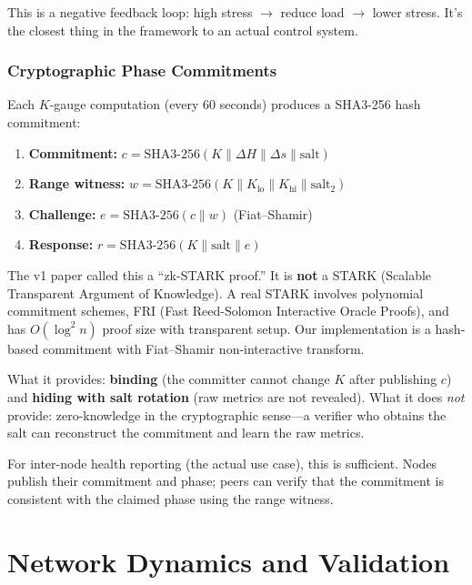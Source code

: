 \documentclass[11pt,a4paper]{article}
\begin{document}
This is a negative feedback loop: high stress $\to$ reduce load $\to$ lower stress. It's the closest thing in the framework to an actual control system.

\section{Cryptographic Phase Commitments}

Each $K$-gauge computation (every 60 seconds) produces a SHA3-256 hash commitment:

\begin{enumerate}[nosep]
    \item \textbf{Commitment:} $c = \text{SHA3-256}(K \| \Delta H \| \Delta s \| \text{salt})$
    \item \textbf{Range witness:} $w = \text{SHA3-256}(K \| K_{\text{lo}} \| K_{\text{hi}} \| \text{salt}_2)$
    \item \textbf{Challenge:} $e = \text{SHA3-256}(c \| w)$ (Fiat--Shamir)
    \item \textbf{Response:} $r = \text{SHA3-256}(K \| \text{salt} \| e)$
\end{enumerate}

\begin{honesty}
The v1 paper called this a ``zk-STARK proof.'' It is \textbf{not} a STARK (Scalable Transparent Argument of Knowledge). A real STARK involves polynomial commitment schemes, FRI (Fast Reed-Solomon Interactive Oracle Proofs), and has $O(\log^2 n)$ proof size with transparent setup. Our implementation is a hash-based commitment with Fiat--Shamir non-interactive transform.

What it provides: \textbf{binding} (the committer cannot change $K$ after publishing $c$) and \textbf{hiding with salt rotation} (raw metrics are not revealed). What it does \emph{not} provide: zero-knowledge in the cryptographic sense---a verifier who obtains the salt can reconstruct the commitment and learn the raw metrics.

For inter-node health reporting (the actual use case), this is sufficient. Nodes publish their commitment and phase; peers can verify that the commitment is consistent with the claimed phase using the range witness.
\end{honesty}

\part{Network Dynamics and Validation}
\end{document}
